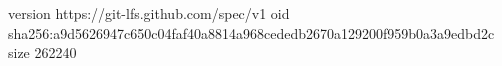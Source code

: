 version https://git-lfs.github.com/spec/v1
oid sha256:a9d5626947c650c04faf40a8814a968cededb2670a129200f959b0a3a9edbd2c
size 262240
